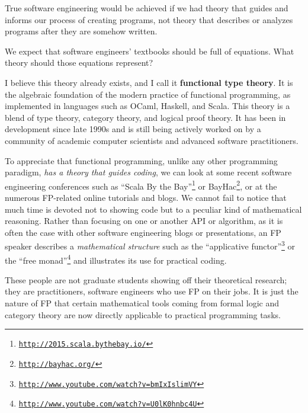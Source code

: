 True software engineering would be achieved if we had theory that
guides and informs our process of creating programs, \textendash{}
not theory that describes or analyzes programs after they are somehow
written.

We expect that software engineers' textbooks should be full of equations.
What theory should those equations represent?

I believe this theory already exists, and I call it \textbf{functional
type theory}. It is the algebraic foundation
of the modern practice of functional programming, as implemented in
languages such as OCaml, Haskell, and Scala. This theory is a blend
of type theory, category theory, and logical proof theory. It has
been in development since late 1990s and is still being actively worked
on by a community of academic computer scientists and advanced software
practitioners.

To appreciate that functional programming, unlike any other programming
paradigm, \emph{has a theory that guides coding}, we can look at some
recent software engineering conferences such as ``Scala By the Bay''\footnote{\texttt{\href{http://2015.scala.bythebay.io/}{http://2015.scala.bythebay.io/}}}
or BayHac\footnote{\texttt{\href{http://bayhac.org/}{http://bayhac.org/}}},
or at the numerous FP-related online tutorials and blogs. We cannot
fail to notice that much time is devoted not to showing code but to
a peculiar kind of mathematical reasoning. Rather than focusing on
one or another API or algorithm, as it is often the case with other
software engineering blogs or presentations, an FP speaker describes
a \emph{mathematical structure} \textendash{} such as the ``applicative
functor''\footnote{\texttt{\href{http://www.youtube.com/watch?v=bmIxIslimVY}{http://www.youtube.com/watch?v=bmIxIslimVY}}}
or the ``free monad''\footnote{\texttt{\href{http://www.youtube.com/watch?v=U0lK0hnbc4U}{http://www.youtube.com/watch?v=U0lK0hnbc4U}}}
\textendash{} and illustrates its use for practical coding.

These people are not graduate students showing off their theoretical
research; they are practitioners, software engineers who use FP on
their jobs. It is just the nature of FP that certain mathematical
tools \textendash{} coming from formal logic and category theory \textendash{}
are now directly applicable to practical programming tasks.

